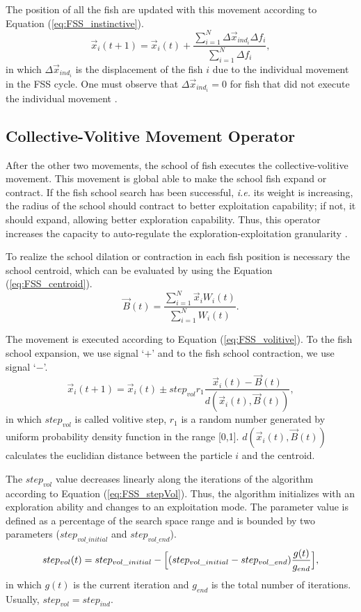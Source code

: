 The position of all the fish are updated with this movement according to Equation (\ref{eq:FSS_instinctive}).
\begin{equation}\label{eq:FSS_instinctive}
\vec x_i(t+1) = \vec x_i(t) + \frac{\sum_{i=1}^{N}\Delta \vec x_{ind_i} \Delta f_i}{\sum_{i=1}^{N}\Delta f_i},
\end{equation}
in which $\Delta \vec x_{ind_i}$ is the displacement of the fish $i$ due to the individual movement in the FSS cycle. One must observe that $\Delta \vec x_{ind_i} = 0$ for fish that did not execute the individual movement \cite{FSS:Lins2012}.

\subsection{Collective-Volitive Movement Operator}\label{sse:FSS_volitive}
After the other two movements, the school of fish executes the collective-volitive movement. This movement is global able to make the school fish expand or contract. If the fish school search has been successful, \textit{i.e.} its weight is increasing, the radius of the school should contract to better exploitation capability; if not, it should expand, allowing better exploration capability. Thus, this operator increases the capacity to auto-regulate the exploration-exploitation granularity \cite{FSS:Lins2012}.

To realize the school dilation or contraction in each fish position is necessary the school centroid, which can be evaluated by using the Equation (\ref{eq:FSS_centroid}).
\begin{equation}\label{eq:FSS_centroid}
\vec B(t) = \frac{\sum_{i=1}^{N}\vec x_iW_i(t)}{\sum_{i=1}^{N}W_i(t)}.
\end{equation}

The movement is executed according to Equation (\ref{eq:FSS_volitive}). To the fish school expansion, we use signal `$+$' and to the fish school contraction, we use signal `$-$'.
\begin{equation}\label{eq:FSS_volitive}
\vec x_i(t+1) = \vec x_i(t) \pm step_{vol}r_1 \frac{\vec x_i(t) - \vec B(t)}{d(\vec x_i(t) ,\vec B(t))},
\end{equation}
in which $step_{vol}$ is called volitive step, $r_1$ is a random number generated by uniform probability density function in the range [0,1]. $d(\vec x_i(t) ,\vec B(t))$ calculates the euclidian distance between the particle $i$ and the centroid.

The $step_{vol}$ value decreases linearly along the iterations of the algorithm according to Equation (\ref{eq:FSS_stepVol}). Thus, the algorithm initializes with an exploration ability and changes to an exploitation mode. The parameter value is defined as a percentage of the search space range and is bounded by two parameters ($step_{vol\_initial}$ and $step_{vol\_end}$).
\begin{equation}\label{eq:FSS_stepVol}
step_{vol}(t) = step_{vol\_initial} - \Bigl[(step_{vol\_initial} - step_{vol\_end}) \frac{g(t)}{g_{end}}\Bigr],
\end{equation}
in which $g(t)$ is the current iteration and $g_{end}$ is the total number of iterations. Usually, $step_{vol} = step_{ind}$.

